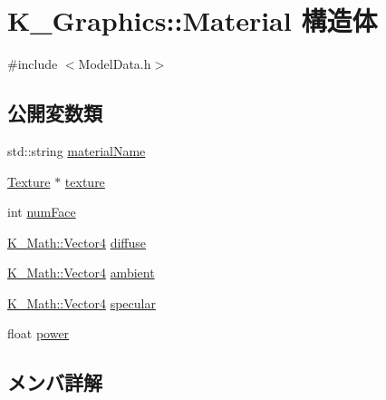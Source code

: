 \hypertarget{struct_k___graphics_1_1_material}{}\section{K\+\_\+\+Graphics\+:\+:Material 構造体}
\label{struct_k___graphics_1_1_material}


{\ttfamily \#include $<$Model\+Data.\+h$>$}

\subsection*{公開変数類}
\begin{DoxyCompactItemize}
\item 
std\+::string \mbox{\hyperlink{struct_k___graphics_1_1_material_a46639dd9cd5e4d0bc1f2c8937b9eb8a6}{material\+Name}}
\item 
\mbox{\hyperlink{class_k___graphics_1_1_texture}{Texture}} $\ast$ \mbox{\hyperlink{struct_k___graphics_1_1_material_a7dda4b3d5e5b22bafc4c51b8a898f85f}{texture}}
\item 
int \mbox{\hyperlink{struct_k___graphics_1_1_material_aab8d503269eda94bf6e106ed1bdb8682}{num\+Face}}
\item 
\mbox{\hyperlink{namespace_k___math_a8d82de9de17eae460600de1e40e8a01f}{K\+\_\+\+Math\+::\+Vector4}} \mbox{\hyperlink{struct_k___graphics_1_1_material_abb41fcdf2a6addf387a167e65020d927}{diffuse}}
\item 
\mbox{\hyperlink{namespace_k___math_a8d82de9de17eae460600de1e40e8a01f}{K\+\_\+\+Math\+::\+Vector4}} \mbox{\hyperlink{struct_k___graphics_1_1_material_a90c85b825fe0712b7a45574620de5b47}{ambient}}
\item 
\mbox{\hyperlink{namespace_k___math_a8d82de9de17eae460600de1e40e8a01f}{K\+\_\+\+Math\+::\+Vector4}} \mbox{\hyperlink{struct_k___graphics_1_1_material_acacefc1e75642a1b8113c91616f470bf}{specular}}
\item 
float \mbox{\hyperlink{struct_k___graphics_1_1_material_aa48c514ab3b2797cc0d2d23c472500f1}{power}}
\end{DoxyCompactItemize}


\subsection{メンバ詳解}
\mbox{\label{struct_k___graphics_1_1_material_a90c85b825fe0712b7a45574620de5b47}} 
